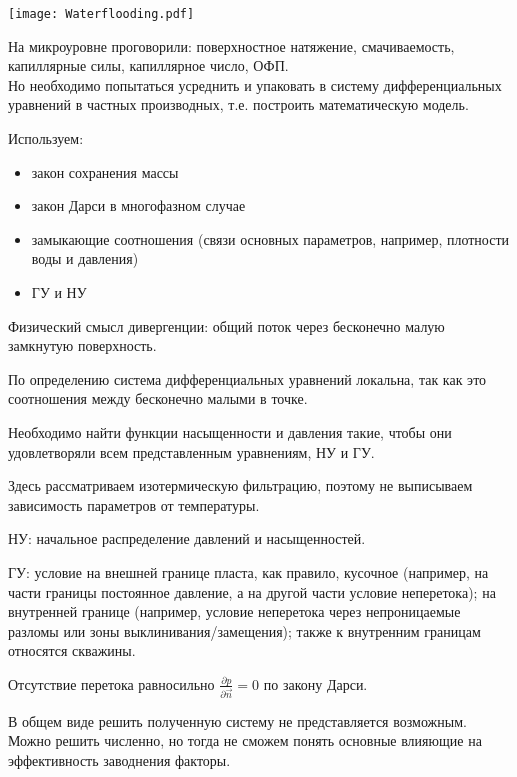 \documentclass[main.tex]{subfiles}
\begin{document}
\texttt{[image: Waterflooding.pdf]}

На микроуровне проговорили: поверхностное натяжение, смачиваемость, капиллярные силы, капиллярное число, ОФП.\\

Но необходимо попытаться усреднить и упаковать в систему дифференциальных уравнений в частных производных, т.е. построить математическую модель.


Используем:
\begin{itemize}
	\item закон сохранения массы
	\item закон Дарси в многофазном случае
	\item замыкающие соотношения (связи основных параметров, например, плотности воды и давления)
	\item ГУ и НУ
\end{itemize}

Физический смысл дивергенции: общий поток через бесконечно малую замкнутую поверхность.

По определению система дифференциальных уравнений локальна, так как это соотношения между бесконечно малыми в точке.

Необходимо найти функции насыщенности и давления такие, чтобы они удовлетворяли всем представленным уравнениям, НУ и ГУ.


Здесь рассматриваем изотермическую фильтрацию, поэтому не выписываем зависимость параметров от температуры.

НУ: начальное распределение давлений и насыщенностей.

ГУ: условие на внешней границе пласта, как правило, кусочное (например, на части границы постоянное давление, а на другой части условие неперетока); на внутренней границе (например, условие неперетока через непроницаемые разломы или зоны выклинивания/замещения); также к внутренним границам относятся скважины.

Отсутствие перетока равносильно $\displaystyle{}\frac{\partial p}{\partial \vec{n}}=0$ по закону Дарси.

В общем виде решить полученную систему не представляется возможным. Можно решить численно, но тогда не сможем понять основные влияющие на эффективность заводнения факторы.
\end{document}
